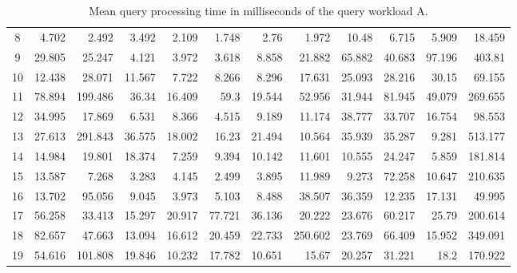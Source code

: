 \documentclass[conference]{IEEEtran}
\begin{document}
\begin{table}[!th]
{\begin{tabular}{|c|r|r|r|r|r|r|r|r|r|r|r|}
			8  & 4.702   & 2.492   & 3.492  & 2.109  & 1.748  & 2.76   & 1.972   & 10.48  & 6.715   & 5.909  & 18.459  \\
			9  & 29.805  & 25.247  & 4.121  & 3.972  & 3.618  & 8.858  & 21.882  & 65.882 & 40.683  & 97.196 & 403.81  \\
			10 & 12.438  & 28.071  & 11.567 & 7.722  & 8.266  & 8.296  & 17.631  & 25.093 & 28.216  & 30.15  & 69.155  \\
			11 & 78.894  & 199.486 & 36.34  & 16.409 & 59.3   & 19.544 & 52.956  & 31.944 & 81.945  & 49.079 & 269.655 \\
			12 & 34.995  & 17.869  & 6.531  & 8.366  & 4.515  & 9.189  & 11.174  & 38.777 & 33.707  & 16.754 & 98.553  \\
			13 & 27.613  & 291.843 & 36.575 & 18.002 & 16.23  & 21.494 & 10.564  & 35.939 & 35.287  & 9.281  & 513.177 \\
			14 & 14.984  & 19.801  & 18.374 & 7.259  & 9.394  & 10.142 & 11.601  & 10.555 & 24.247  & 5.859  & 181.814 \\
			15 & 13.587  & 7.268   & 3.283  & 4.145  & 2.499  & 3.895  & 11.989  & 9.273  & 72.258  & 10.647 & 210.635 \\
			16 & 13.702  & 95.056  & 9.045  & 3.973  & 5.103  & 8.488  & 38.507  & 36.359 & 12.235  & 17.131 & 49.995  \\
			17 & 56.258  & 33.413  & 15.297 & 20.917 & 77.721 & 36.136 & 20.222  & 23.676 & 60.217  & 25.79  & 200.614 \\
			18 & 82.657  & 47.663  & 13.094 & 16.612 & 20.459 & 22.733 & 250.602 & 23.769 & 66.409  & 15.952 & 349.091 \\
			19 & 54.616  & 101.808 & 19.846 & 10.232 & 17.782 & 10.651 & 15.67   & 20.257 & 31.221  & 18.2   & 170.922 \\ \hline
		\end{tabular}%
	}
	\caption{Mean query processing time in milliseconds of the query workload A.}
	\label{tab:benchmark_A}
\end{table}
\end{document}
